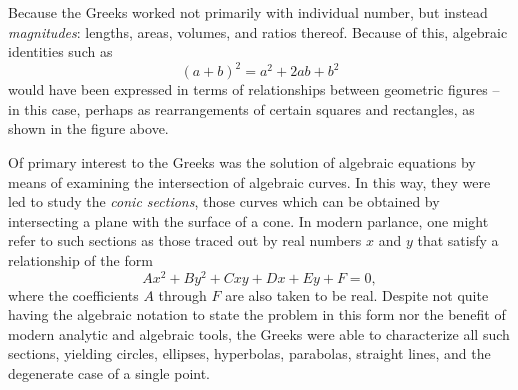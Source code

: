 \documentclass{article}
\theoremstyle{definition}
\begin{document}
Because the Greeks worked not primarily with individual number, but
instead \emph{magnitudes}: lengths, areas, volumes, and ratios thereof.
Because of this, algebraic identities such as
\[(a+b)^2 = a^2 + 2ab + b^2\] would have been expressed in terms of
relationships between geometric figures -- in this case, perhaps as
rearrangements of certain squares and rectangles, as
shown in the figure above.

Of primary interest to the Greeks was the solution of algebraic
equations by means of examining the intersection of algebraic curves. In
this way, they were led to study the \emph{conic sections}, those curves
which can be obtained by intersecting a plane with the surface of a
cone. In modern parlance, one might refer to such sections as those
traced out by real numbers \(x\) and \(y\) that satisfy a relationship
of the form \[Ax^2 +By^2 + Cxy + Dx + Ey + F = 0,\] where the
coefficients \(A\) through \(F\) are also taken to be real. Despite not
quite having the algebraic notation to state the problem in this form
nor the benefit of modern analytic and algebraic tools, the Greeks were
able to characterize all such sections, yielding circles, ellipses,
hyperbolas, parabolas, straight lines, and the degenerate case of a
single point.
\end{document}

